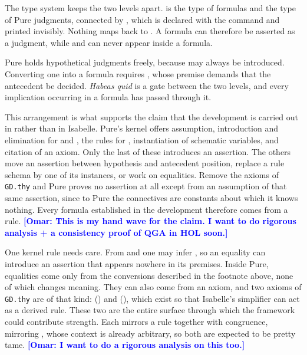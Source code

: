 \documentclass[11pt]{article}
\newcommand{\omar}[1]{\textcolor{blue}{\textbf{[Omar: #1]}}}
\begin{document}
The type system keeps the two levels apart.   is the type of \QGA{}
formulas and  the type of Pure judgments, connected by
, which is declared with the  command and
printed invisibly.  Nothing maps  back to .  A \QGA{} formula can
therefore be asserted as a judgment, while  and  can never appear
inside a \QGA{} formula.

Pure holds hypothetical judgments freely, because  may always be
introduced.  Converting one into a \QGA{} formula requires , whose
premise  demands that the antecedent be decided.  \emph{Habeas quid} is
a gate between the two levels, and every implication occurring in a
\QGA{} formula has passed through it.

This arrangement is what supports the claim that the development is carried out
in \QGA{} rather than in Isabelle.  Pure's kernel offers assumption, introduction
and elimination for  and , the rules for , instantiation of
schematic variables, and citation of an axiom.  Only the last of these introduces
an assertion.  The others move an assertion between hypothesis and antecedent
position, replace a rule schema by one of its instances, or work on equalities.
Remove the axioms of \texttt{GD.thy} and Pure proves no assertion at all except
from an assumption of that same assertion, since to Pure the \QGA{} connectives
are constants about which it knows nothing.  Every \QGA{} formula established in
the development therefore comes from a \QGA{} rule. \omar{This is my hand wave for the claim. I want to do rigorous analysis + a consistency proof of QGA in HOL soon.}

One kernel rule needs care.  From  and  one may infer ,
so an equality can introduce an assertion that appears nowhere in its premises.
Inside Pure, equalities come only from the conversions described in the footnote
above, none of which changes meaning.  They can also come from an axiom, and two
axioms of \texttt{GD.thy} are of that kind: 
() and  (), which
exist so that Isabelle's simplifier can act as a derived rule.  These two are the
entire surface through which the framework could contribute strength.  Each
mirrors a \QGA{} rule together with congruence,  mirroring
, whose context  is already arbitrary, so both are
expected to be pretty tame. \omar{I want to do a rigorous analysis on this too.}
\end{document}
